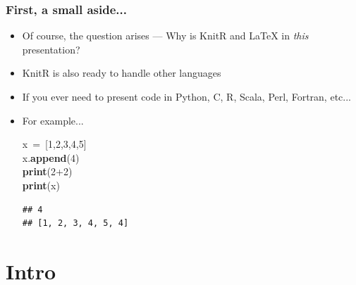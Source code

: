 \documentclass{beamer}\usepackage[]{graphicx}\usepackage[]{color}
\makeatletter
\newcommand{\hlnum}[1]{\textcolor[rgb]{0.686,0.059,0.569}{#1}}%
\newcommand{\hlopt}[1]{\textcolor[rgb]{0,0,0}{#1}}%
\newcommand{\hlstd}[1]{\textcolor[rgb]{0.345,0.345,0.345}{#1}}%
\newcommand{\hlkwa}[1]{\textcolor[rgb]{0.161,0.373,0.58}{\textbf{#1}}}%
\newcommand{\hlkwd}[1]{\textcolor[rgb]{0.737,0.353,0.396}{\textbf{#1}}}%
\newenvironment{kframe}{%
 \def\at@end@of@kframe{}%
 \ifinner\ifhmode%
  \def\at@end@of@kframe{\end{minipage}}%
  \begin{minipage}{\columnwidth}%
 \fi\fi%
 \def\FrameCommand##1{\hskip\@totalleftmargin \hskip-\fboxsep
 \colorbox{shadecolor}{##1}\hskip-\fboxsep
     \hskip-\linewidth \hskip-\@totalleftmargin \hskip\columnwidth}%
 \MakeFramed {\advance\hsize-\width
   \@totalleftmargin\z@ \linewidth\hsize
   \@setminipage}}%
 {\par\unskip\endMakeFramed%
 \at@end@of@kframe}
\newenvironment{knitrout}{}{} %
\makeatother
\begin{document}
\begin{frame}[fragile]
\frametitle{First, a small aside...}

\begin{itemize}
		\item Of course, the question arises --- Why is KnitR and \LaTeX{} in \emph{this} presentation?

	\item KnitR is also ready to handle other languages

	\item If you ever need to present code in Python, C, R, Scala, Perl, Fortran, etc...

	\item For example...

\begin{knitrout}
\color{fgcolor}\begin{kframe}
\noindent
\ttfamily
\hlstd{x\ }\hlopt{=\ {[}}\hlstd{}\hlnum{1}\hlstd{}\hlopt{,}\hlstd{}\hlnum{2}\hlstd{}\hlopt{,}\hlstd{}\hlnum{3}\hlstd{}\hlopt{,}\hlstd{}\hlnum{4}\hlstd{}\hlopt{,}\hlstd{}\hlnum{5}\hlstd{}\hlopt{{]}}\hspace*{\fill}\\
\hlstd{x}\hlopt{.}\hlstd{}\hlkwd{append}\hlstd{}\hlopt{(}\hlstd{}\hlnum{4}\hlstd{}\hlopt{)}\hspace*{\fill}\\
\hlstd{}\hlkwa{print}\hlstd{}\hlopt{(}\hlstd{}\hlnum{2}\hlstd{}\hlopt{+}\hlstd{}\hlnum{2}\hlstd{}\hlopt{)}\hspace*{\fill}\\
\hlstd{}\hlkwa{print}\hlstd{}\hlopt{(}\hlstd{x}\hlopt{)}\hlstd{}\hspace*{\fill}
\mbox{}
\normalfont

\begin{verbatim}
## 4
## [1, 2, 3, 4, 5, 4]
\end{verbatim}
\end{kframe}
\end{knitrout}
\end{itemize}
\end{frame}

\section{Intro}
\end{document}
